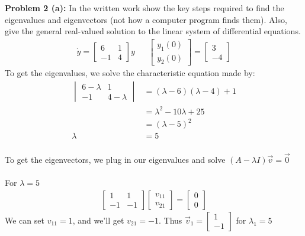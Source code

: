 \documentclass[12pt]{article}
\begin{document}
\noindent \textbf{Problem 2 (a): }In the written work show the key steps required to find the eigenvalues and eigenvectors (not how a computer program finds them). Also, give the general real-valued solution to the linear system of differential equations.
	\begin{align*}
		\dot{y} = 
		\begin{bmatrix}
			6 & 1 \\ -1 & 4
		\end{bmatrix}
		y 
		&& 
		\begin{bmatrix}
			y_1(0) \\ y_2(0)
		\end{bmatrix}
		= 
		\begin{bmatrix}
			3 \\ -4
		\end{bmatrix}
	\end{align*}
To get the eigenvalues, we solve the characteristic equation made by:
	\begin{align*}
		\begin{vmatrix}
			6 - \lambda & 1 \\
			-1 & 4 - \lambda 
		\end{vmatrix}
		&= (\lambda - 6)(\lambda - 4) + 1 \\
		&= \lambda^2 - 10\lambda + 25 \\
		&= (\lambda - 5)^2 \\
		\lambda &= 5
	\end{align*}
\\
To get the eigenvectors, we plug in our eigenvalues and solve $(A - \lambda I)\vec{v} = \vec{0}$
\\ \\
For $\lambda = 5$
	\begin{align*}
		\begin{bmatrix}
			1 & 1 \\ -1 & -1
		\end{bmatrix}
		\begin{bmatrix}
			v_{11} \\ v_{21}
		\end{bmatrix}
		= 
		\begin{bmatrix}
			0 \\ 0
		\end{bmatrix}
	\end{align*} 
We can set $v_{11} = 1$, and we'll get $v_{21} = -1$. Thus $\vec{v}_1 = \begin{bmatrix}	1 \\ -1	\end{bmatrix}$ for $\lambda_1 = 5$
\end{document}

